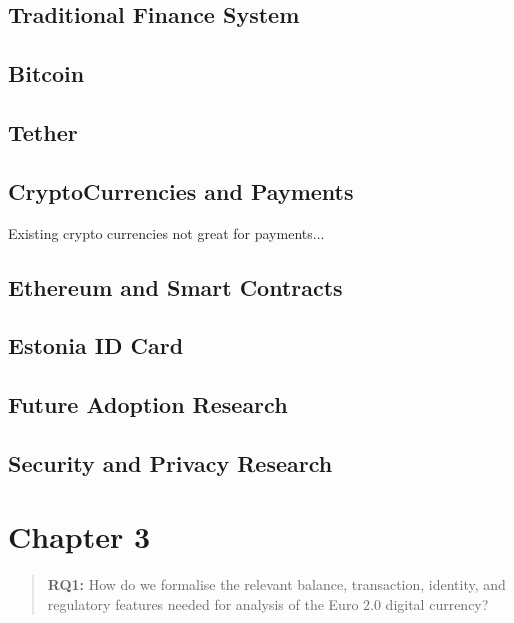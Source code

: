 \documentclass[12pt]{article} %
\begin{document}

\subsection{Traditional Finance System}

\subsection{Bitcoin}

\subsection{Tether}

\subsection{CryptoCurrencies and Payments}
Existing crypto currencies not great for payments...

\subsection{Ethereum and Smart Contracts}

\subsection{Estonia ID Card}

\subsection{Future Adoption Research}

\subsection{Security and Privacy Research}

\pagebreak

\section{Chapter 3}
\label{Chapter 3}


\begin{quotation}
\textbf{RQ1:} How do we formalise the relevant balance, transaction, identity, and regulatory features needed for analysis of the Euro 2.0 digital currency?
\end{quotation}
\end{document}
